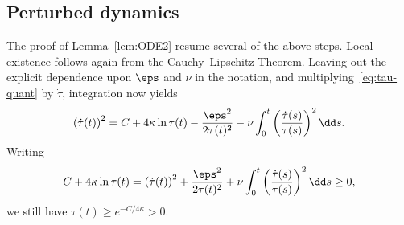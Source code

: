 \subsection{Perturbed dynamics}

The proof of Lemma~\ref{lem:ODE2} resume several of the above steps. Local existence follows again from the Cauchy--Lipschitz Theorem. Leaving out the explicit dependence upon $\eps$ and $\nu$ in the notation, and multiplying~\eqref{eq:tau-quant} by $\dot\tau$, integration now yields
\begin{equation}\label{eq:taupoint-quant}
\left(\dot \tau(t)\right)^2 = C+4\kappa \ln \tau(t) -\frac{\eps^2}{2\tau(t)^2} -\nu\int_0^t\left(\frac{\dot \tau(s)}{\tau(s)}\right)^2\dd s.
\end{equation}
Writing
\begin{equation*}
C+4\kappa \ln \tau(t) = \left(\dot \tau(t)\right)^2 +\frac{\eps^2}{2\tau(t)^2}+ \nu\int_0^t\left(\frac{\dot
\tau(s)}{\tau(s)}\right)^2\dd s\ge 0,
\end{equation*}
we still have $\tau(t)\ge e^{-C/4\kappa}>0$.

